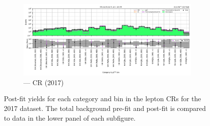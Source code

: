 \begin{figure}[htbp]
    \begin{subfigure}[b]{0.65\textwidth}
        \includegraphics[width=\textwidth]{chapters/higgstoinv/figures/mountain_ranges/2017/ttH/Zee_tree_fit_b-abs_values_ttH_cats.pdf}
        \caption{\ttH --- \doubleEleCr \gls{CR} (2017)}
    \end{subfigure}
    \caption[Post-fit yields for each \ttH category and \ptmiss bin in the lepton control regions for the 2017 dataset]{Post-fit yields for each \ttH category and \ptmiss bin in the lepton \glspl{CR} for the 2017 dataset. The total background pre-fit and post-fit is compared to data in the lower panel of each subfigure.}
    \label{fig:htoinv_mountain_range_ttH_2017_CRs}
\end{figure}

